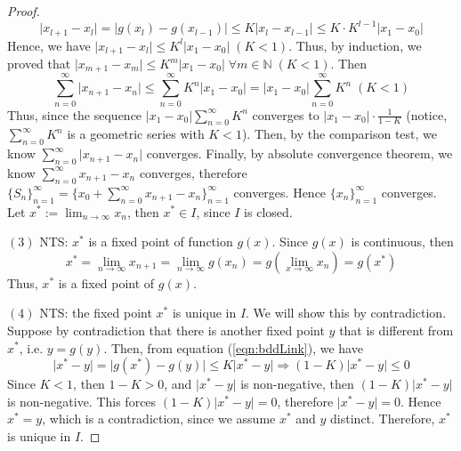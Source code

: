 \documentclass{article}
\theoremstyle{definition}
\theoremstyle{remark}
\theoremstyle{example}
\begin{document}
\begin{proof}
    \begin{equation}
        \rvert x_{l + 1} - x_l \rvert = \lvert g(x_l) - g(x_{l-1}) \rvert \leq K \lvert x_l - x_{l-1}\rvert \leq K \cdot K^{l-1} \rvert x_1 - x_0 \rvert
    \end{equation}
    Hence, we have $\lvert x_{l+1} - x_l \rvert \leq K^l \lvert x_1 - x_0 \rvert \; (K < 1)$. Thus, by induction, we proved that $\lvert x_{m+1} - x_m \rvert \leq K^m \lvert x_1 - x_0 \rvert \; \forall m \in \mathbb{N} \; (K < 1)$. Then 
    \begin{equation}\label{eqn:comparison}
        \sum_{n = 0}^{\infty}{\lvert x_{n+1} - x_n \rvert} \leq \sum_{n = 0}^{\infty}{K^n\lvert x_1 - x_0 \rvert} = \lvert x_1 - x_0 \rvert \sum_{n = 0}^{\infty}{K^n} \; (K < 1)
    \end{equation}
    Thus, since the sequence $\lvert x_1 - x_0 \rvert \sum_{n = 0}^{\infty}{K^n}$ converges to $\lvert x_1 - x_0 \rvert \cdot \tfrac{1}{1-K}$ (notice, $\sum_{n = 0}^{\infty}{K^n}$ is a geometric series with $K < 1$). Then, by the comparison test, we know $\sum_{n = 0}^{\infty}{\lvert x_{n+1} - x_n \rvert}$ converges. Finally, by absolute convergence theorem, we know $\sum_{n = 0}^{\infty}{x_{n+1} - x_n}$ converges, therefore $\{S_n\}_{n = 1}^{\infty} = \{x_0 + \sum_{n = 0}^{\infty}{x_{n+1} - x_n}\}_{n = 1}^{\infty}$ converges. Hence $\{x_n\}_{n = 1}^{\infty}$ converges. Let $x^{*} := \lim_{n \to \infty}{x_n}$, then $x^{*} \in I$, since $I$ is closed.
    
    $(3)$ NTS: $x^{*}$ is a fixed point of function $g(x)$. \; Since $g(x)$ is continuous, then
    \begin{equation}
        x^{*} = \lim_{n\to \infty}{x_{n+1}} = \lim_{n \to \infty}{g(x_n)} = g(\lim_{x \to \infty}{x_n}) = g(x^{*})
    \end{equation}
    Thus, $x^{*}$ is a fixed point of $g(x)$.
    
    $(4)$ NTS: the fixed point $x^{*}$ is unique in $I$. \; We will show this by contradiction. Suppose by contradiction that there is another fixed point $y$ that is different from $x^{*}$, i.e. $y = g(y)$. Then, from equation (\ref{eqn:bddLink}), we have
    \begin{equation}
        \lvert x^{*} - y \rvert = \lvert g(x^{*}) - g(y) \rvert \leq K \lvert x^{*} - y \rvert \Rightarrow (1-K)\lvert x^{*} - y \rvert \leq 0
    \end{equation}
    Since $K < 1$, then $1 - K > 0$, and $\lvert x^{*} - y \rvert$ is non-negative, then $(1-K)\lvert x^{*} - y \rvert$ is non-negative. This forces $(1-K)\lvert x^{*} - y \rvert = 0$, therefore $\lvert x^{*} - y \rvert = 0$. Hence $x^{*} = y$, which is a contradiction, since we assume $x^{*}$ and $y$ distinct. Therefore, $x^{*}$ is unique in $I$.
\end{proof}
\end{document}
